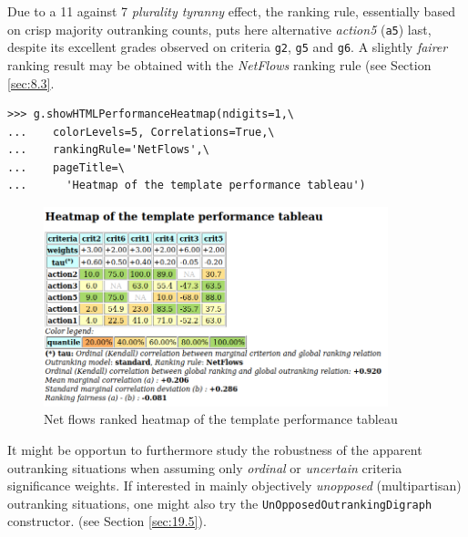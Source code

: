 Due to a 11 against 7 \emph{plurality tyranny} effect, the \Copeland ranking rule, essentially based on crisp majority outranking counts, puts here alternative \emph{action5} (\texttt{a5}) last, despite its excellent grades observed on criteria \texttt{g2}, \texttt{g5} and \texttt{g6}. A slightly \emph{fairer} ranking result may be obtained with the \emph{NetFlows} ranking rule (see Section \ref{sec:8.3}.
\begin{lstlisting}
>>> g.showHTMLPerformanceHeatmap(ndigits=1,\
...    colorLevels=5, Correlations=True,\
...    rankingRule='NetFlows',\
...    pageTitle=\
...      'Heatmap of the template performance tableau')
\end{lstlisting}
\begin{figure}[h]
\includegraphics[width=10cm]{Figures/templateHeatmapNF.png}
\caption{Net flows ranked heatmap of the template performance tableau}
\label{fig:5.3}       %
\end{figure}

It might be opportun to furthermore study the robustness of the apparent outranking situations when assuming only \emph{ordinal} or \emph{uncertain} criteria significance weights. If interested in mainly objectively \emph{unopposed} (multipartisan) outranking situations, one might also try the {\tt UnOpposedOutrankingDigraph} constructor. (see Section \ref{sec:19.5}). 
 
\clearpage

\typeout{}

%